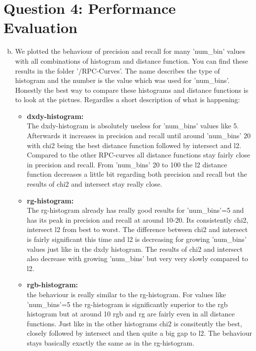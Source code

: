 \documentclass[12pt]{article}
\begin{document}
\newpage
\section*{Question 4: Performance Evaluation}

\begin{enumerate}[a)]
    \setcounter{enumi}{1}
    \item 
        We plotted the behaviour of precision and recall for many 'num\_bin' values with all combinations of histogram and distance function. You can find these results in the folder '/RPC-Curves'. The name describes the type of histogram and the number is the value which was used for 'num\_bins'. Honestly the best way to compare these histograms and distance functions is to look at the pictues. Regardles a short description of what is happening:
        \begin{itemize}
            \item 
                \textbf{dxdy-histogram:}\\
                The dxdy-histogram is absolutely useless for 'num\_bins' values like 5. Afterwards it increases in precision and recall until around 'num\_bins' 20 with chi2 being the best distance function followed by intersect and l2. Compared to the other RPC-curves all distance functions stay fairly close in precision and recall. From 'num\_bins' 20 to 100 the l2 distance function decreases a little bit regarding both precision and recall but the results of chi2 and intersect stay really close.
            \item 
                \textbf{rg-histogram:}\\
                The rg-histogram already has really good results for 'num\_bins'=5 and has its peak in precision and recall at around 10-20. Its consistently chi2, intersect l2 from best to worst. The difference between chi2 and intersect is fairly significant this time and l2 is decreasing for growing 'num\_bins' values just like in the dxdy histogram. The results of chi2 and intersect also decrease with growing 'num\_bins' but very very slowly compared to l2.
            \item 
                \textbf{rgb-histogram:}\\
                the behaviour is really similar to the rg-histogram. For values like 'num\_bins'=5 the rg-histogram is significantly superior to the rgb histogram but at around 10 rgb and rg are fairly even in all distance functions. Just like in the other histograms chi2 is consitently the best, closely followed by intersect and then quite a big gap to l2. The behaviour stays basically exactly the same as in the rg-histogram.

\end{itemize}
\end{enumerate}
\end{document}
